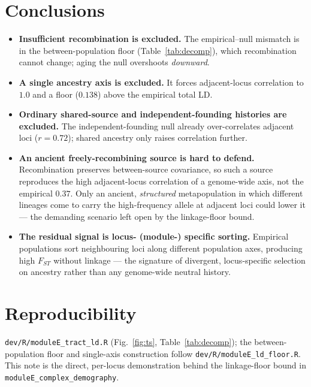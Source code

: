 \documentclass[11pt,a4paper]{article}
\begin{document}
\section{Conclusions}
\begin{itemize}\itemsep2pt
  \item \textbf{Insufficient recombination is excluded.} The empirical--null mismatch is
  in the between-population floor (Table~\ref{tab:decomp}), which recombination cannot
  change; aging the null overshoots \emph{downward}.
  \item \textbf{A single ancestry axis is excluded.} It forces adjacent-locus correlation
  to $1.0$ and a floor ($0.138$) above the empirical total LD.
  \item \textbf{Ordinary shared-source and independent-founding histories are excluded.}
  The independent-founding null already over-correlates adjacent loci ($r=0.72$); shared
  ancestry only raises correlation further.
  \item \textbf{An ancient freely-recombining source is hard to defend.} Recombination
  preserves between-source covariance, so such a source reproduces the high adjacent-locus
  correlation of a genome-wide axis, not the empirical $0.37$. Only an ancient,
  \emph{structured} metapopulation in which different lineages come to carry the
  high-frequency allele at adjacent loci could lower it --- the demanding scenario left
  open by the linkage-floor bound.
  \item \textbf{The residual signal is locus- (module-) specific sorting.} Empirical
  populations sort neighbouring loci along different population axes, producing high
  $F_{ST}$ without linkage --- the signature of divergent, locus-specific selection on
  ancestry rather than any genome-wide neutral history.
\end{itemize}

\section*{Reproducibility}
\texttt{dev/R/moduleE\_tract\_ld.R} (Fig.~\ref{fig:ts}, Table~\ref{tab:decomp}); the
between-population floor and single-axis construction follow
\texttt{dev/R/moduleE\_ld\_floor.R}. This note is the direct, per-locus demonstration
behind the linkage-floor bound in \texttt{moduleE\_complex\_demography}.
\end{document}
